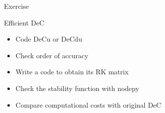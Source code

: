 \documentclass[9pt,compress,t,aspectratio=169]{beamer}
\begin{document}
\begin{frame}{Exercise}
	\begin{block}{Efficient DeC}
		\begin{itemize}
			\item Code DeCu or DeCdu
			\item Check order of accuracy
			\item Write a code to obtain its RK matrix
			\item Check the stability function with nodepy
			\item Compare computational costs with original DeC
		\end{itemize}		
	\end{block}
	
\end{frame}
\end{document}
